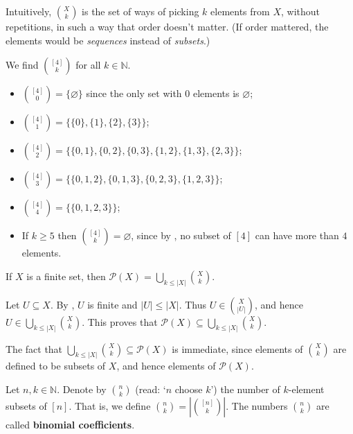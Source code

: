 Intuitively, $\binom{X}{k}$ is the set of ways of picking $k$ elements from $X$, without repetitions, in such a way that order doesn't matter. (If order mattered, the elements would be \textit{sequences} instead of \textit{subsets}.)

\begin{example} \label{exFinSubsetsOf4}
We find $\binom{[4]}{k}$ for all $k \in \mathbb{N}$.
\begin{itemize}
\item $\binom{[4]}{0} = \{\varnothing\}$ since the only set with $0$ elements is $\varnothing$;
\item $\binom{[4]}{1} = \{ \{0\}, \{1\}, \{2\}, \{3\} \}$;
\item $\binom{[4]}{2} = \{ \{0,1\}, \{0,2\}, \{0,3\}, \{1,2\}, \{1,3\}, \{2,3\} \}$;
\item $\binom{[4]}{3} = \{ \{0,1,2\}, \{0,1,3\}, \{0,2,3\}, \{1,2,3\} \}$;
\item $\binom{[4]}{4} = \{ \{ 0,1,2,3 \} \}$;
\item If $k \ge 5$ then $\binom{[4]}{k} = \varnothing$, since by , no subset of $[4]$ can have more than $4$ elements.
\end{itemize}
\end{example}

\begin{proposition}
\label{propUnionOfFinSubsetsEqPowerSet}
If $X$ is a finite set, then $\mathcal{P}(X) = \bigcup_{k \le |X|} \binom{X}{k}$.
\end{proposition}
\begin{cproof}
Let $U \subseteq X$. By , $U$ is finite and $|U| \le |X|$. Thus $U \in \binom{X}{|U|}$, and hence $U \in \bigcup_{k \le |X|} \binom{X}{k}$. This proves that $\mathcal{P}(X) \subseteq \bigcup_{k \le |X|} \binom{X}{k}$.

The fact that $\bigcup_{k \le |X|} \binom{X}{k} \subseteq \mathcal{P}(X)$ is immediate, since elements of $\binom{X}{k}$ are defined to be subsets of $X$, and hence elements of $\mathcal{P}(X)$.
\end{cproof}

\begin{definition}
\label{defBinomialCoefficient}
Let $n,k \in \mathbb{N}$. Denote by $\binom{n}{k}$ (read: `$n$ choose $k$')  the number of $k$-element subsets of $[n]$. That is, we define $\binom{n}{k} = \left|\binom{[n]}{k}\right|$. The numbers $\binom{n}{k}$ are called \textbf{binomial coefficients}.
\end{definition}

